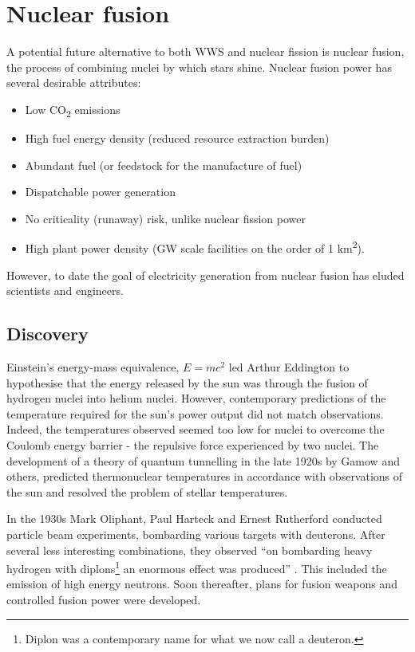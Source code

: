 
\section{Nuclear fusion}
A potential future alternative to both WWS and nuclear fission is nuclear fusion, the process of combining nuclei by which stars shine. Nuclear fusion power has several desirable attributes:

\begin{itemize}
  \item Low CO\textsubscript{2} emissions
  \item High fuel energy density (reduced resource extraction burden)
  \item Abundant fuel (or feedstock for the manufacture of fuel)
  \item Dispatchable power generation
  \item No criticality (runaway) risk, unlike nuclear fission power
  \item High plant power density (GW scale facilities on the order of 1 km\textsuperscript{2}). 
\end{itemize}

However, to date the goal of electricity generation from nuclear fusion has eluded scientists and engineers.  

\subsection{Discovery}
Einstein's energy-mass equivalence, $E=mc^{2}$ led Arthur Eddington to hypothesise that the energy released by the sun was through the fusion of hydrogen nuclei into helium nuclei. However, contemporary predictions of the temperature required for the sun's power output did not match observations. Indeed, the temperatures observed seemed too low for nuclei to overcome the Coulomb energy barrier - the repulsive force experienced by two nuclei. The development of a theory of quantum tunnelling in the late 1920s by Gamow and others, predicted thermonuclear temperatures in accordance with observations of the sun and resolved the problem of stellar temperatures.

In the 1930s Mark Oliphant, Paul Harteck and Ernest Rutherford conducted particle beam experiments, bombarding various targets with deuterons. After several less interesting combinations, they observed ``on bombarding heavy hydrogen with diplons\footnote{Diplon was a contemporary name for what we now call a deuteron.} an enormous effect was produced'' \cite{oliphant1934}. This included the emission of high energy neutrons. Soon thereafter, plans for fusion weapons and controlled fusion power were developed.

